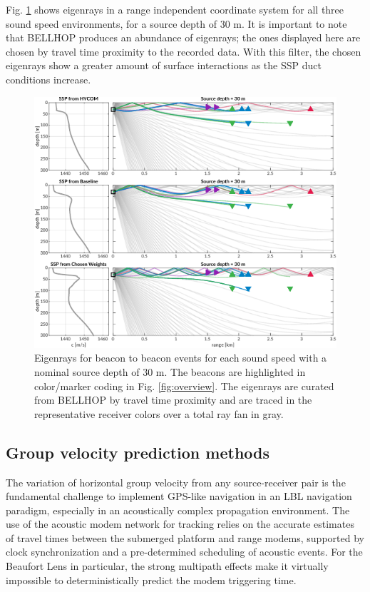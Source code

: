 Fig. \ref{fig:raytrace-zs30} shows eigenrays in a range independent coordinate system for all three sound speed environments, for a source depth of 30 m.
 It is important to note that BELLHOP produces an abundance of eigenrays; the ones displayed here are chosen by travel time proximity to the recorded data.
With this filter, the chosen eigenrays show a greater amount of surface interactions as the SSP duct conditions increase.

\begin{figure}[h!]
  \centering
  \includegraphics[width=\reprintcolumnwidth]{figs/Fig4.pdf}
  \caption{Eigenrays for beacon to beacon events for each sound speed with a nominal source depth of 30 m. The beacons are highlighted in color/marker coding in Fig. \ref{fig:overview}. The eigenrays are curated from BELLHOP by travel time proximity and are traced in the representative receiver colors over a total ray fan in gray.}
  \label{fig:raytrace-zs30}
  \end{figure}

\FloatBarrier
\subsection{Group velocity prediction methods}

The variation of horizontal group velocity from any source-receiver pair is the fundamental challenge to implement GPS-like navigation in an LBL navigation paradigm, especially in an acoustically complex propagation environment.
The use of the acoustic modem network for tracking relies on the accurate estimates of travel times between the submerged platform and range modems, supported by clock synchronization and a pre-determined scheduling of acoustic events.
 For the Beaufort Lens in particular, the strong multipath effects make it virtually impossible to deterministically predict the modem triggering time.

